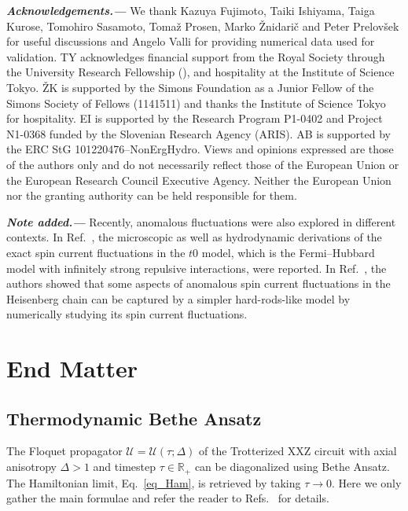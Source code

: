 \documentclass[
twocolumn,
amsfonts,
showpacs,
superscriptaddress,
amsmath,
amssymb,
aps,
longbibliography,
prl,
noeprint
]{revtex4-2}
\newcommand{\ch}[1]{{\color{black}  #1}}
\newcommand{\para}[1]{ \noindent\emph{\textbf{#1---}}}
\newcounter{ls}
\newcommand{\1}{{\bf 1}}
\begin{document}
\para{Acknowledgements.}
We thank Kazuya Fujimoto, Taiki Ishiyama, Taiga Kurose, Tomohiro Sasamoto, Tomaž Prosen, Marko Žnidarič and Peter Prelovšek for useful discussions and Angelo Valli for providing numerical data used for validation. TY acknowledges financial support from the Royal Society through the University Research Fellowship (), and hospitality at the Institute of Science Tokyo.
\v{Z}K is supported by the Simons Foundation as a Junior Fellow of the Simons Society of Fellows (1141511) and thanks the Institute of Science Tokyo for hospitality.
EI is supported by the Research Program P1-0402 and Project N1-0368 funded by the Slovenian Research Agency (ARIS).
\ch{AB is supported by the ERC StG 101220476–NonErgHydro.
Views and opinions expressed are those of the authors only and do not necessarily reflect those of the European Union or the European Research Council Executive Agency. Neither the European Union nor the granting authority can be held responsible for them.}


\para{ Note added.}
Recently, anomalous fluctuations were also explored in different contexts. In Ref.~\cite{Fujimoto2026}, the microscopic as well as hydrodynamic derivations of the exact spin current fluctuations in the $t0$ model, which is the Fermi--Hubbard model with infinitely strong repulsive interactions, were reported. In Ref.~\cite{Urilyon2026-2}, the authors showed that some aspects of anomalous spin current fluctuations in the Heisenberg chain can be captured by a simpler hard-rods-like model by numerically studying its spin current fluctuations.















\bigskip


\section{End Matter}

\subsection*{Thermodynamic Bethe Ansatz}
The Floquet propagator $\mathcal{U}=\mathcal{U}(\tau;\Delta)$ of the Trotterized XXZ circuit with axial anisotropy $\Delta>1$ and timestep $\tau \in \mathbb{R}_{+}$ can be diagonalized using Bethe Ansatz.
The Hamiltonian limit, Eq.~\eqref{eq_Ham}, is retrieved by taking $\tau\to 0$.
Here we only gather the main formulae and refer the reader to Refs.~\cite{Vernier_2023,Zadnik_2024} for details.
\end{document}
